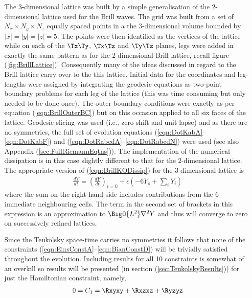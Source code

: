 \documentclass[a4paper,12pt]{article}
\numberwithin{equation}{section}
\begin{document}
The 3-dimensional lattice was built by a simple generalisation of the 2-dimensional lattice
used for the Brill waves. The grid was built from a set of $N_x\times N_y\times N_z$ equally
spaced points in a the 3-dimensional volume bounded by $\vert x\vert=\vert y\vert=\vert
z\vert=5$. The points were then identified as the vertices of the lattice while on each of
the $\Tx\Ty$, $\Tx\Tz$ and $\Ty\Tz$ planes, legs were added in exactly the same pattern as
for the 2-dimensional Brill lattice, recall figure (\ref{fig:BrillLattice}). Consequently
many of the ideas discussed in regard to the Brill lattice carry over to the this lattice.
Initial data for the coordinates and leg-lengths were assigned by integrating the geodesic
equations as two-point boundary problems for each leg of the lattice (this was time
consuming but only needed to be done once). The outer boundary conditions were exactly as
per equation (\ref{eqn:BrillOuterBC}) but on this occasion applied to all six faces of the
lattice. Geodesic slicing was used (i.e., zero shift and unit lapse) and as there are no
symmetries, the full set of evolution equations (\ref{eqn:DotKabA}--\ref{eqn:DotKabF}) and
(\ref{eqn:DotRabcdA}--\ref{eqn:DotRabcdN}) were used (see also Appendix
(\ref{sec:FullRiemannEqtns})). The implementation of the numerical dissipation is in this
case slightly different to that for the 2-dimensional lattice. The appropriate version of
(\ref{eqn:BrillKODissip}) for the 3-dimensional lattice is
\begin{align}
   \frac{dY}{dt} = \left(\frac{dY}{dt}\right)_{\epsilon=0}
                 + \epsilon \left(-6Y_o + \sum_i Y_i\right)
\end{align}
where the sum on the right hand side includes contributions from the 6 immediate neighbouring
cells. The term in the second set of brackets in this expression is an approximation to
$\BigO{L^2}\nabla^2 Y$ and thus will converge to zero on successively refined lattices.

Since the Teukolsky space-time carries no symmetries it follows that none of the
constraints (\ref{eqn:EinsConstA}--\ref{eqn:BianConstD}) will be trivially satisfied
throughout the evolution. Including results for all 10 constraints is somewhat of an
overkill so results will be presented (in section (\ref{sec:TeukolskyResults})) for just
the Hamiltonian constraint, namely,
\begin{align}
   \label{eqn:TeukConstC1}
   0 = C_1 = \Rxyxy+\Rxzxz+\Ryzyz
\end{align}
\end{document}
